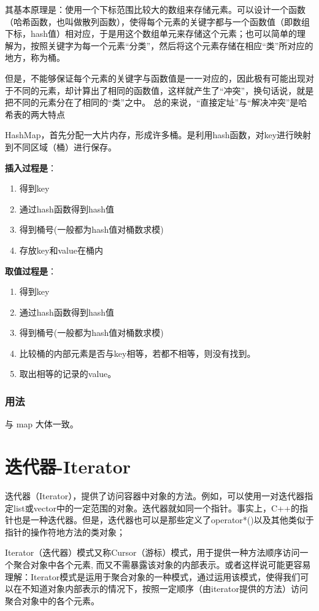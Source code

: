 \documentclass[UTF8,a4paper,12pt]{ctexbook}
\begin{document}
		其基本原理是：使用一个下标范围比较大的数组来存储元素。可以设计一个函数（哈希函数，也叫做散列函数），使得每个元素的关键字都与一个函数值（即数组下标，hash值）相对应，于是用这个数组单元来存储这个元素；也可以简单的理解为，按照关键字为每一个元素“分类”，然后将这个元素存储在相应“类”所对应的地方，称为桶。
		
		但是，不能够保证每个元素的关键字与函数值是一一对应的，因此极有可能出现对于不同的元素，却计算出了相同的函数值，这样就产生了“冲突”，换句话说，就是把不同的元素分在了相同的“类”之中。 总的来说，“直接定址”与“解决冲突”是哈希表的两大特点  
		
		HashMap，首先分配一大片内存，形成许多桶。是利用hash函数，对key进行映射到不同区域（桶）进行保存。
		
		\textbf{插入过程是}：
			\begin{enumerate}[itemindent = 1em]
				\item 得到key
				\item 通过hash函数得到hash值
				\item 得到桶号(一般都为hash值对桶数求模)
				\item 存放key和value在桶内
			\end{enumerate}
		
		\textbf{取值过程是}：
			\begin{enumerate}[itemindent = 1em]
				\item 得到key
				\item 通过hash函数得到hash值
				\item 得到桶号(一般都为hash值对桶数求模)
				\item 比较桶的内部元素是否与key相等，若都不相等，则没有找到。
				\item 取出相等的记录的value。
			\end{enumerate}
	\subsection{用法}
		与 map 大体一致。


\chapter{迭代器-Iterator}
		迭代器（Iterator），提供了访问容器中对象的方法。例如，可以使用一对迭代器指定list或vector中的一定范围的对象。迭代器就如同一个指针。事实上，C++的指针也是一种迭代器。但是，迭代器也可以是那些定义了operator*()以及其他类似于指针的操作符地方法的类对象；
		
		Iterator（迭代器）模式又称Cursor（游标）模式，用于提供一种方法顺序访问一个聚合对象中各个元素, 
		而又不需暴露该对象的内部表示。或者这样说可能更容易理解：Iterator模式是运用于聚合对象的一种模式，通过运用该模式，使得我们可以在不知道对象内部表示的情况下，按照一定顺序（由iterator提供的方法）访问聚合对象中的各个元素。
		
\end{document}
